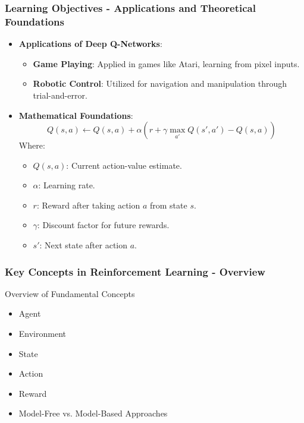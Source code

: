\documentclass[aspectratio=169]{beamer}
\begin{document}
\begin{frame}[fragile]
    \frametitle{Learning Objectives - Applications and Theoretical Foundations}
    \begin{itemize}
        \item \textbf{Applications of Deep Q-Networks}:
        \begin{itemize}
            \item \textbf{Game Playing}: Applied in games like Atari, learning from pixel inputs.
            \item \textbf{Robotic Control}: Utilized for navigation and manipulation through trial-and-error.
        \end{itemize}

        \item \textbf{Mathematical Foundations}:
        \begin{equation}
            Q(s, a) \leftarrow Q(s, a) + \alpha \left( r + \gamma \max_{a'} Q(s', a') - Q(s, a) \right)
        \end{equation}
        Where:
        \begin{itemize}
            \item \( Q(s, a) \): Current action-value estimate.
            \item \( \alpha \): Learning rate.
            \item \( r \): Reward after taking action \( a \) from state \( s \).
            \item \( \gamma \): Discount factor for future rewards.
            \item \( s' \): Next state after action \( a \).
        \end{itemize}
    \end{itemize}
\end{frame}

\begin{frame}[fragile]
    \frametitle{Key Concepts in Reinforcement Learning - Overview}
    \begin{block}{Overview of Fundamental Concepts}
        \begin{itemize}
            \item Agent
            \item Environment
            \item State
            \item Action
            \item Reward
            \item Model-Free vs. Model-Based Approaches
        \end{itemize}
    \end{block}
\end{frame}
\end{document}
